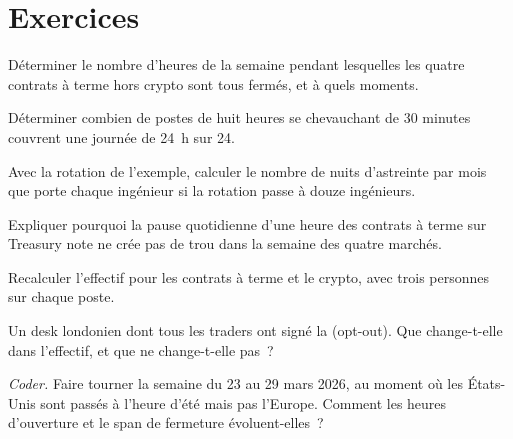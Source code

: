\section{Exercices}

\begin{exercise}[$\star$]\label{exo:in:hours-rhythm-and-intensity:1}
Déterminer le nombre d'heures de la semaine pendant lesquelles les quatre contrats à terme hors crypto sont tous fermés, et à quels moments.
\end{exercise}

\begin{exercise}[$\star$]\label{exo:in:hours-rhythm-and-intensity:2}
Déterminer combien de postes de huit heures se chevauchant de 30 minutes couvrent une journée de 24~h sur 24.
\end{exercise}

\begin{exercise}[$\star$]\label{exo:in:hours-rhythm-and-intensity:3}
Avec la rotation de l'exemple, calculer le nombre de nuits d'astreinte par mois que porte chaque ingénieur si la rotation passe à douze ingénieurs.
\end{exercise}

\begin{exercise}[$\star\star$]\label{exo:in:hours-rhythm-and-intensity:4}
Expliquer pourquoi la pause quotidienne d'une heure des contrats à terme sur Treasury note ne crée pas de trou dans la semaine des quatre marchés.
\end{exercise}

\begin{exercise}[$\star\star$]\label{exo:in:hours-rhythm-and-intensity:5}
Recalculer l'effectif pour les contrats à terme et le crypto, avec trois personnes sur chaque poste.
\end{exercise}

\begin{exercise}[$\star\star$]\label{exo:in:hours-rhythm-and-intensity:6}
Un desk londonien dont tous les traders ont signé la  (opt-out). Que change-t-elle dans l'effectif, et
que ne change-t-elle pas~?
\end{exercise}

\begin{exercise}[$\star\star\star$]\label{exo:in:hours-rhythm-and-intensity:7}
\emph{Coder.} Faire tourner la semaine du 23 au 29 mars 2026, au moment où les États-Unis sont passés à l'heure d'été mais pas l'Europe. Comment
les heures d'ouverture et le span de fermeture évoluent-elles~?
\end{exercise}

